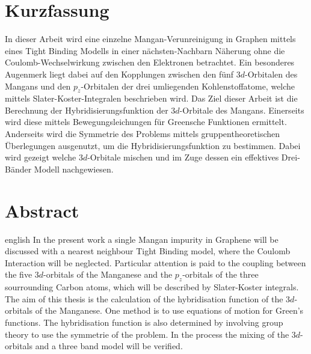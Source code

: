 \thispagestyle{plain}

\section*{Kurzfassung}
In dieser Arbeit wird eine einzelne Mangan-Verunreinigung in Graphen mittels eines Tight Binding Modells in einer nächsten-Nachbarn Näherung
ohne die Coulomb-Wechselwirkung zwischen den Elektronen betrachtet.
Ein besonderes Augenmerk liegt dabei auf den Kopplungen zwischen den fünf $3d$-Orbitalen des Mangans und den $p_z$-Orbitalen der drei umliegenden 
Kohlenstoffatome, welche mittels Slater-Koster-Integralen beschrieben wird.
Das Ziel dieser Arbeit ist die Berechnung der Hybridisierungsfunktion der $3d$-Orbitale des Mangans.
Einerseits wird diese mittels Bewegungsleichungen für Greensche Funktionen ermittelt.
Anderseits wird die Symmetrie des Problems mittels gruppentheoretischen Überlegungen ausgenutzt, um die Hybridisierungsfunktion zu bestimmen.
Dabei wird gezeigt welche $3d$-Orbitale mischen und im Zuge dessen ein effektives Drei-Bänder Modell nachgewiesen.
\section*{Abstract}
\begin{foreignlanguage}{english}
In the present work a single Mangan impurity in Graphene will be discussed with a nearest neighbour Tight Binding model, where
the Coulomb Interaction will be neglected.
Particular attention is paid to the coupling between the five $3d$-orbitals of the Manganese and the $p_z$-orbitals of the three
sourrounding Carbon atoms, which will be described by Slater-Koster integrals.
The aim of this thesis is the calculation of the hybridisation function of the $3d$-orbitals of the Manganese.
One method is to use equations of motion for Green's functions. 
The hybridisation function is also determined by involving group theory to use the symmetrie of the problem.
In the process the mixing of the $3d$-orbitals and a three band model will be verified. 
\end{foreignlanguage}